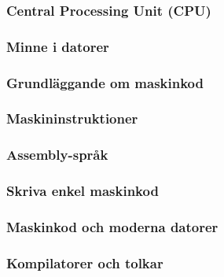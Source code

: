 \begin{frame}[fragile=singleslide]
    \frametitle{Central Processing Unit (CPU)}
\end{frame}

\begin{frame}[fragile=singleslide]
    \frametitle{Minne i datorer}
\end{frame}

\begin{frame}[fragile=singleslide]
    \frametitle{Grundläggande om maskinkod}
\end{frame}

\begin{frame}[fragile=singleslide]
    \frametitle{Maskininstruktioner}
\end{frame}

\begin{frame}[fragile=singleslide]
    \frametitle{Assembly-språk}
\end{frame}

\begin{frame}[fragile=singleslide]
    \frametitle{Skriva enkel maskinkod}
\end{frame}

\begin{frame}[fragile=singleslide]
    \frametitle{Maskinkod och moderna datorer}
\end{frame}

\begin{frame}[fragile=singleslide]
    \frametitle{Kompilatorer och tolkar}
\end{frame}


